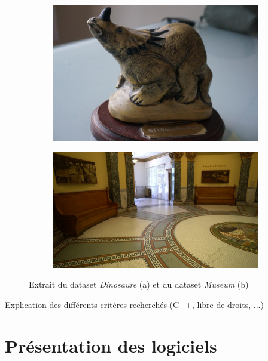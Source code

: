 \begin{figure}[ht]
    \centering
    \begin{subfigure}{0.40\textwidth}
        \includegraphics[width=\linewidth]{datas/dino_image.jpg}
        \caption{}
    \end{subfigure}
    \begin{subfigure}{0.47\textwidth}
        \includegraphics[width=\linewidth]{datas/museum_image.jpg}
        \caption{}
    \end{subfigure}

    \caption{Extrait du dataset \emph{Dinosaure} (a) et du dataset \emph{Museum} (b)}
    \label{fig:dataset_exemple}
\end{figure}

Explication des différents critères recherchés (C++, libre de droits, ...)

\section{Présentation des logiciels}

